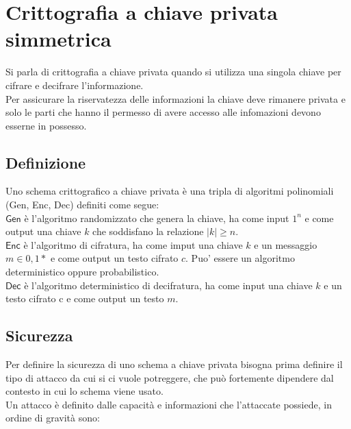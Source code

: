 \chapter{Crittografia a chiave privata simmetrica}

Si parla di crittografia a chiave privata quando si utilizza una singola chiave per cifrare e decifrare l'informazione. \\
Per assicurare la riservatezza delle informazioni la chiave deve rimanere privata e solo le parti che hanno il permesso di avere accesso alle infomazioni devono esserne in possesso.

\section{Definizione}
Uno schema crittografico a chiave privata è una tripla di algoritmi polinomiali (Gen, Enc, Dec) definiti come segue: \\
$\mathsf{Gen}$ è l'algoritmo randomizzato che genera la chiave, ha come input $1^{n}$ e come output una chiave $k$ che soddisfano la relazione $|k| \geq n$. \\
$\mathsf{Enc}$ è l'algoritmo di cifratura, ha come imput una chiave $k$ e un messaggio $m \in {0,1}*$ e come output un testo cifrato $c$.
Puo' essere un algoritmo deterministico oppure probabilistico. \\
$\mathsf{Dec}$ è l'algoritmo deterministico di decifratura, ha come input una chiave $k$ e un testo cifrato c e come output un testo $m$.

\section{Sicurezza}
Per definire la sicurezza di uno schema a chiave privata bisogna prima definire il tipo di attacco da cui si ci vuole potreggere, che può fortemente dipendere dal contesto in cui lo schema viene usato. \\
Un attacco è definito dalle capacità e informazioni che l'attaccate possiede, in ordine di gravità sono:
